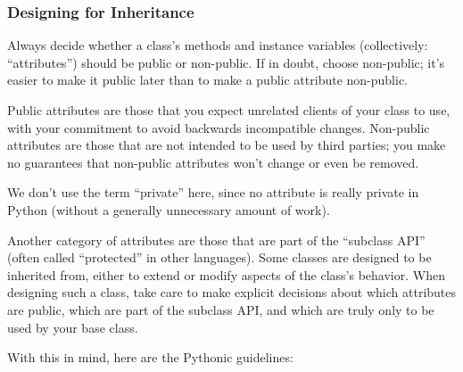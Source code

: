 \documentclass[a4paper,11pt]{article}
\begin{document}
\subsubsection{Designing for Inheritance}
Always decide whether a class’s methods and instance variables (collectively: 
“attributes”) should be public or non-public. If in doubt, choose non-public; 
it’s easier to make it public later than to make a public attribute 
non-public.
\par
Public attributes are those that you expect unrelated clients of your class 
to use, with your commitment to avoid backwards incompatible changes. 
Non-public attributes are those that are not intended to be used by third 
parties; you make no guarantees that non-public attributes won’t change or 
even be removed.
\par
We don’t use the term “private” here, since no attribute is really private in 
Python (without a generally unnecessary amount of work).
\par
Another category of attributes are those that are part of the “subclass API” 
(often called “protected” in other languages). Some classes are designed to 
be inherited from, either to extend or modify aspects of the class’s 
behavior. When designing such a class, take care to make explicit decisions 
about which attributes are public, which are part of the subclass API, and 
which are truly only to be used by your base class.
\par
With this in mind, here are the Pythonic guidelines:
\end{document}
